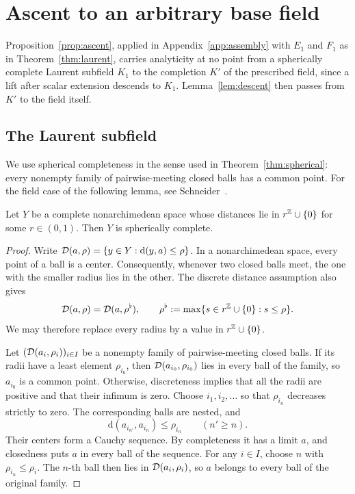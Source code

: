 \section{Ascent to an arbitrary base field}\label{app:ascent}\label{sec:ascent}

Proposition~\ref{prop:ascent}, applied in Appendix~\ref{app:assembly} with $E_1$ and $F_1$ as in Theorem~\ref{thm:laurent},
carries analyticity at no point from a spherically complete Laurent subfield $K_1$ to the completion $K'$ of the prescribed
field, since a lift after scalar extension descends to $K_1$. Lemma~\ref{lem:descent} then passes from $K'$ to the field itself.

\subsection{The Laurent subfield}
We use spherical completeness in the sense used in Theorem~\ref{thm:spherical}: every nonempty family of pairwise-meeting
closed balls has a common point. For the field case of the following lemma, see
Schneider~\cite[Lemmas~1.3 and~1.6]{Sch}.

\begin{lemma}\label{lem:discdist}
Let $Y$ be a complete nonarchimedean space whose distances lie in $r^\mathbb Z\cup\{0\}$ for some $r\in(0,1)$. Then $Y$ is
spherically complete.
\end{lemma}

\begin{proof}
Write $\mathcal{D}(a,\rho)=\{y\in Y:\mathrm d(y,a)\le\rho\}$. In a nonarchimedean space, every point of a ball is a center.
Consequently, whenever two closed balls meet, the one with the smaller radius lies in the other.
The discrete distance assumption also gives
\[
\mathcal{D}(a,\rho)=\mathcal{D}(a,\rho^\flat),\qquad
\rho^\flat:=\max\{s\in r^\mathbb Z\cup\{0\}:s\le\rho\}.
\]
We may therefore replace every radius by a value in $r^\mathbb Z\cup\{0\}$.

Let $(\mathcal{D}(a_i,\rho_i))_{i\in I}$ be a nonempty family of pairwise-meeting closed balls. If its radii have a least
element $\rho_{i_0}$, then $\mathcal{D}(a_{i_0},\rho_{i_0})$ lies in every ball of the family, so $a_{i_0}$ is a common point.
Otherwise, discreteness implies that all the radii are positive and that their infimum is zero. Choose
$i_1,i_2,\dots$ so that $\rho_{i_n}$ decreases strictly to zero. The corresponding balls are nested, and
\[
\mathrm d(a_{i_{n'}},a_{i_n})\le\rho_{i_n}\qquad(n'\ge n).
\]
Their centers form a Cauchy sequence. By completeness it has a limit $a$, and closedness puts $a$ in every ball
of the sequence. For any $i\in I$, choose $n$ with $\rho_{i_n}\le\rho_i$. The $n$\nobreakdash-th ball then lies in
$\mathcal{D}(a_i,\rho_i)$, so $a$ belongs to every ball of the original family.
\end{proof}



